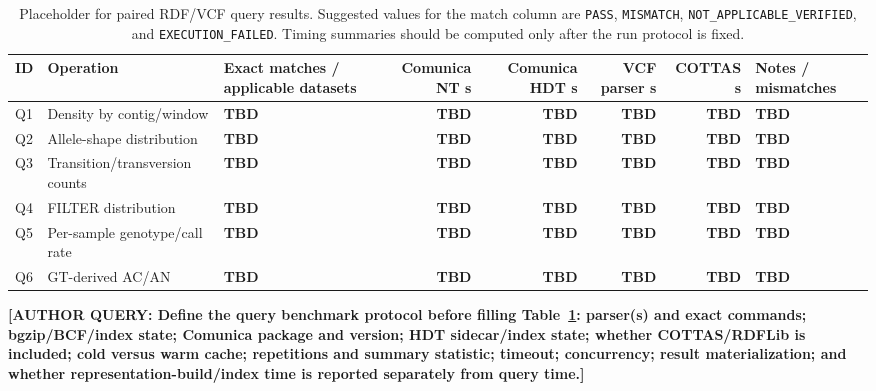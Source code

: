 \documentclass[pdflatex,sn-mathphys-num]{sn-jnl}%
\newenvironment{revision}{\begingroup\color{revisionblue}}{\endgroup}%
\newcommand{\authorquery}[1]{%
  \par\smallskip\noindent
  {\color{queryorange}\textbf{[AUTHOR QUERY: #1]}}%
  \par\smallskip
}%
\theoremstyle{thmstyleone}%
\theoremstyle{thmstyletwo}%
\theoremstyle{thmstylethree}%
\begin{document}
\begin{revision}
\begin{table}[t]
\caption{Placeholder for paired RDF/VCF query results. Suggested values for the match column are \texttt{PASS}, \texttt{MISMATCH}, \texttt{NOT\_APPLICABLE\_VERIFIED}, and \texttt{EXECUTION\_FAILED}. Timing summaries should be computed only after the run protocol is fixed.}\label{tab:query-placeholder}%
\centering
\scriptsize
\setlength{\tabcolsep}{3pt}
\begin{tabularx}{\textwidth}{@{}p{}p{}p{}rrrrX@{}}
\toprule
\textbf{ID} & \textbf{Operation} & \textbf{Exact matches / applicable datasets} & \textbf{Comunica NT s} & \textbf{Comunica HDT s} & \textbf{VCF parser s} & \textbf{COTTAS s} & \textbf{Notes / mismatches} \\
\midrule
Q1 & Density by contig/window & \textbf{TBD} & \textbf{TBD} & \textbf{TBD} & \textbf{TBD} & \textbf{TBD} & \textbf{TBD} \\
Q2 & Allele-shape distribution & \textbf{TBD} & \textbf{TBD} & \textbf{TBD} & \textbf{TBD} & \textbf{TBD} & \textbf{TBD} \\
Q3 & Transition/transversion counts & \textbf{TBD} & \textbf{TBD} & \textbf{TBD} & \textbf{TBD} & \textbf{TBD} & \textbf{TBD} \\
Q4 & FILTER distribution & \textbf{TBD} & \textbf{TBD} & \textbf{TBD} & \textbf{TBD} & \textbf{TBD} & \textbf{TBD} \\
Q5 & Per-sample genotype/call rate & \textbf{TBD} & \textbf{TBD} & \textbf{TBD} & \textbf{TBD} & \textbf{TBD} & \textbf{TBD} \\
Q6 & GT-derived AC/AN & \textbf{TBD} & \textbf{TBD} & \textbf{TBD} & \textbf{TBD} & \textbf{TBD} & \textbf{TBD} \\
\bottomrule
\end{tabularx}
\end{table}
\end{revision}
\authorquery{Define the query benchmark protocol before filling Table~\ref{tab:query-placeholder}: parser(s) and exact commands; bgzip/BCF/index state; Comunica package and version; HDT sidecar/index state; whether COTTAS/RDFLib is included; cold versus warm cache; repetitions and summary statistic; timeout; concurrency; result materialization; and whether representation-build/index time is reported separately from query time.}
\end{document}

